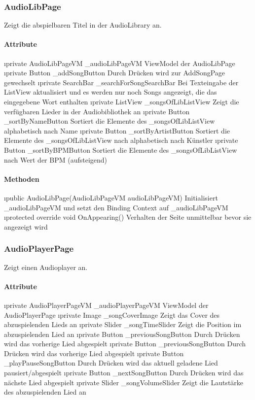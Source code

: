 \documentclass[../entwurf.tex]{subfiles}
\begin{document}
\subsubsection{AudioLibPage}
Zeigt die abspielbaren Titel in der AudioLibrary an.
\paragraph{Attribute}
\begin{itemize}
	\i{private AudioLibPageVM \_audioLibPageVM} ViewModel der AudioLibPage
	\i{private Button \_addSongButton} Durch Drücken wird zur AddSongPage gewechselt
	\i{private SearchBar \_searchForSongSearchBar} Bei Texteingabe der ListView aktualisiert und es werden nur noch Songs angezeigt, die das eingegebene Wort enthalten
	\i{private ListView \_songsOfLibListView} Zeigt die verfügbaren Lieder in der Audiobibliothek an
	\i{private Button \_sortByNameButton} Sortiert die Elemente des \_songsOfLibListView alphabetisch nach Name
	\i{private Button \_sortByArtistButton} Sortiert die Elemente des \_songsOfLibListView nach alphabetisch nach Künstler
	\i{private Button \_sortByBPMButton} Sortiert die Elemente des \_songsOfLibListView nach Wert der BPM (aufsteigend)
\end{itemize}

\paragraph{Methoden}
\begin{itemize}
	\i{public AudioLibPage(AudioLibPageVM audioLibPageVM)} Initialisiert \_audioLibPageVM und setzt den Binding Context 			auf \_audioLibPageVM
	\i{protected override void OnAppearing()} Verhalten der Seite unmittelbar bevor sie angezeigt wird
\end{itemize}

\subsubsection{AudioPlayerPage}
Zeigt einen Audioplayer an.
\paragraph{Attribute}
\begin{itemize}
	\i{private AudioPlayerPageVM \_audioPlayerPageVM} ViewModel der AudioPlayerPage
	\i{private Image \_songCoverImage} Zeigt das Cover des abzuspielenden Lieds an
	\i{private Slider \_songTimeSlider} Zeigt die Position im abzuspielenden Lied an
	\i{private Button \_previousSongButton} Durch Drücken wird das vorherige Lied abgespielt
	\i{private Button \_previousSongButton} Durch Drücken wird das vorherige Lied abgespielt
	\i{private Button \_playPauseSongButton} Durch Drücken wird das aktuell geladene Lied pausiert/abgespielt
	\i{private Button \_nextSongButton} Durch Drücken wird das nächste Lied abgespielt
	\i{private Slider \_songVolumeSlider} Zeigt die Lautstärke des abzuspielenden Lied an
\end{itemize}
\end{document}
